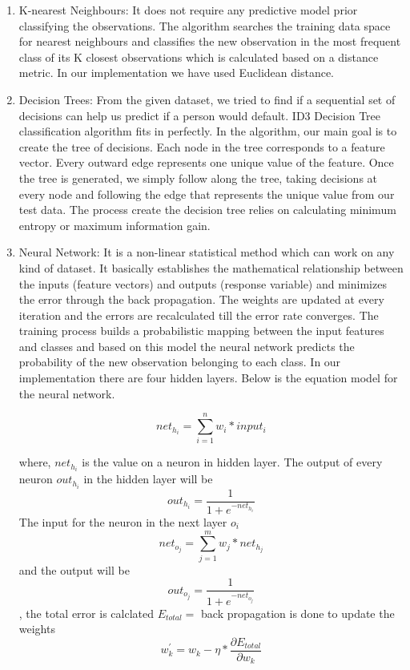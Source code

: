 \documentclass{article}
\begin{document}
\begin{enumerate}

\item K-nearest Neighbours: It does not require any predictive model prior classifying the observations. The algorithm searches the training data space for nearest neighbours and classifies the new observation in the most frequent class of its K closest observations which is calculated based on a distance metric. In our implementation we have used Euclidean distance.

\item Decision Trees:  From the given dataset, we tried to find if a sequential set of decisions can help us predict if a person would default. ID3 Decision Tree classification  algorithm fits in perfectly. In the algorithm, our main goal is to create the tree of decisions. Each node in the tree corresponds to a feature vector. Every outward edge represents one unique value of the feature. Once the tree is generated, we simply follow along the tree, taking decisions at every node and following the edge that represents the unique value from our test data. The process create the decision tree relies on calculating minimum entropy or maximum information gain.

\item Neural Network: It is a non-linear statistical method which can work on any kind of dataset. It basically establishes the mathematical relationship between the inputs (feature vectors) and outputs (response variable) and minimizes the error through the back propagation. The weights are updated at every iteration and the errors are recalculated till the error rate converges. The training process builds a probabilistic mapping between the input features and classes and based on this model the neural network predicts the probability of the new observation belonging to each class. In our implementation there  are four hidden layers. Below is the equation model for the neural network.

 \[net_h_i=\sum_{i=1}^{n} w_i*input_i\] 

where, $net_h_i$ is the value on a neuron in hidden layer. The output of every neuron $out_h_i$ in the hidden layer will be 
\[out_h_i=\frac{1}{1 + e^{-net_h_i}}\]
The input for the neuron in the next layer $o_i$
 \[net_o_j=\sum_{j=1}^{m} w_j*net_h_j\] 
 and the output will be 
 \[out_o_j=\frac{1}{1 + e^{-net_o_j}}\] , the total error is calclated $E_{total}=$
 back propagation is done to update the weights 
 \[{w_k^'}=w_k-\eta*\frac{\partial{E_{total}}}{\partial{w_k}}\]

\end{enumerate}
\end{document}
